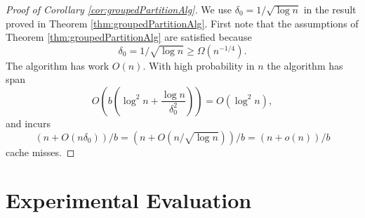 \documentclass[sigconf]{acmart}
\theoremstyle{remark}
\theoremstyle{remark}
\begin{document}
\begin{proof}[Proof of Corollary \ref{cor:groupedPartitionAlg}]
	We use $\delta_0 = 1/\sqrt{\log n}$ in the result proved in Theorem \ref{thm:groupedPartitionAlg}.
	First note that the assumptions of Theorem \ref{thm:groupedPartitionAlg} are satisfied because 
	$$\delta_0=1/\sqrt{\log n} \ge \Omega(n^{-1/4}).$$
	The algorithm has work $O(n)$. 
	With high probability in $n$ the algorithm has span 
	$$O\left(b\left(\log^2 n + \frac{\log n}{\delta_0^2}\right)\right) =  O(\log^2 n),$$ 
	and incurs 
	$$(n+O(n\delta_0))/b = (n+O(n/\sqrt{\log n}))/b = (n+o(n))/b$$ 
	cache misses.
\end{proof}


\section{Experimental Evaluation}\label{secexp}



\begin{figure*}
  \begin{center}
    \CILKsorttable
  \end{center}
  \caption{We compare the performance of the low-space and high-span
    sorting implementations running on varying numbers of threads and
    input sizes. The $x$-axis is the number of worker threads, the
    $y$-axis is the multiplicative speedup when compared to the serial
    baseline, and the log-base-two size of the input is indicated for
    each curve in the key. Each time (including each serial baseline)
    is averaged over five trials.}
  \label{tablesort}
\end{figure*}



\begin{figure*}
  \begin{center}
    \CILKtable 
  \end{center}
    \caption{For a fixed table-size $n = 2^{28}$, we compare each
      implementation's runtime to a serial baseline, which takes 0.96
      seconds to complete (averaged over five trials). The $x$-axis
      plots the number of worker threads being used, and the $y$-axis
      plots the multiplicative speedup over the serial baseline. Each
      time is averaged over five trials.}
      \label{tablecilk}
\end{figure*}
\end{document}
